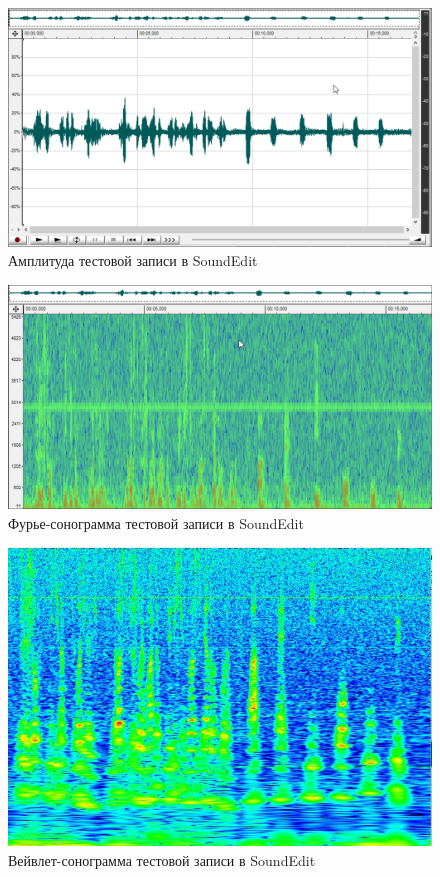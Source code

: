 \begin{figure}
    \centering
    \includegraphics[scale=0.4]{inc/fig_04.png}
    \caption{Амплитуда тестовой записи в SoundEdit}
    \label{fig:fig04}
\end{figure}

\begin{figure}
    \centering
    \includegraphics[scale=0.4]{inc/fig_05.png}
    \caption{Фурье-сонограмма тестовой записи в SoundEdit}
    \label{fig:fig05}
\end{figure}

\begin{figure}
    \centering
    \includegraphics[scale=0.7]{inc/fig_06.jpg}
    \caption{Вейвлет-сонограмма тестовой записи в SoundEdit}
    \label{fig:fig06}
\end{figure}

